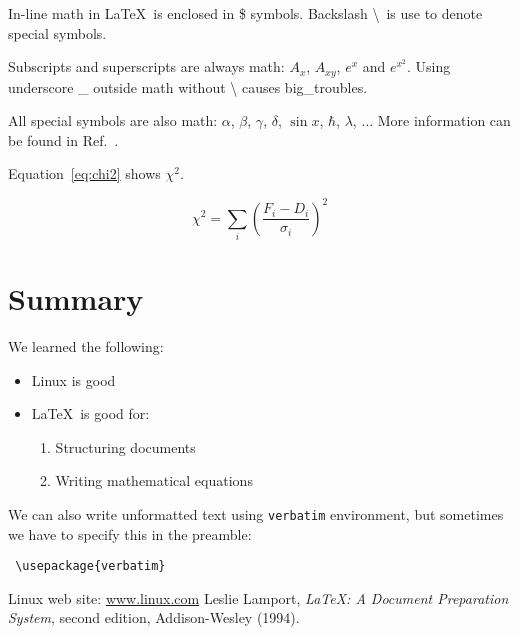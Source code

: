 \documentclass[a4paper,12pt,twoside]{article}
\begin{document}
In-line math in \LaTeX \ is enclosed in \$ symbols. Backslash \textbackslash \ is use to denote special symbols.

Subscripts and superscripts are always math: $A_x$, $A_{xy}$,
$e^x$ and $e^{x^2}$. Using underscore \_ outside math without \textbackslash
causes big\_troubles.

All special symbols are also math: $\alpha$, $\beta$, $\gamma$, $\delta$, $\sin 
x$, $\hbar$, $\lambda$, $\ldots$ More information can be
found in Ref.~\cite{latex}.

Equation~\ref{eq:chi2} shows $\chi^2$.

\begin{equation}
 \label{eq:chi2}
 \chi^2 = \sum\limits_i \left(\frac{F_i-D_i}{\sigma_i}\right)^2
\end{equation}

\section{Summary}
\label{sec:sum}

We learned the following:
\begin{itemize}
 \item Linux is good
 \item \LaTeX \ is good for:
    \begin{enumerate}
     \item Structuring documents
     \item Writing mathematical equations
    \end{enumerate}

\end{itemize}

We can also write unformatted text using \texttt{verbatim} environment, but sometimes we have to specify this in the preamble:
\begin{verbatim}
 \usepackage{verbatim}
\end{verbatim}


\begin{thebibliography}{99}
  Linux web site: \url{www.linux.com}
  Leslie Lamport, \textsl{LaTeX: A Document Preparation System}, second edition, Addison-Wesley (1994).
\end{thebibliography}
\end{document}
